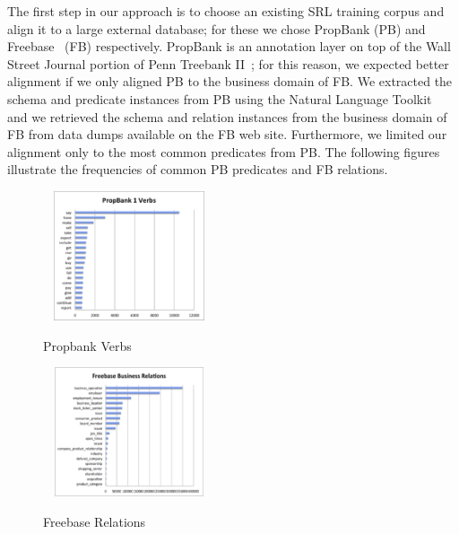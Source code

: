 The first step in our approach is to choose an existing SRL training corpus and align it to a large external database; for these we chose PropBank (PB) and Freebase~\cite{bollacker_freebase:_2008} (FB) respectively.
PropBank is an annotation layer on top of the Wall Street Journal portion of Penn Treebank II~\cite{marcus_building_1993}; for this reason, we expected better alignment if we only aligned PB to the business domain of FB.
We extracted the schema and predicate instances from PB using the Natural Language Toolkit~\cite{bird_nltk:_2006} and we retrieved the schema and relation instances from the business domain of FB from data dumps available on the FB web site.
Furthermore, we limited our alignment only to the most common predicates from PB.  The following figures illustrate the frequencies of common PB predicates and FB relations.

\begin{figure} [ht]

\begin{center}
{\label{avgstalls_CIF}\includegraphics[width = 2in, height = 1.5in]{propverbs.png}}
\caption{Propbank Verbs}
\vspace{-0.5cm}
\label{}
\end{center}
\end{figure}

\begin{figure} [ht]
\begin{center}
{\label{avgstalls_CIF}\includegraphics[width = 2in, height = 1.5in]{freebaserels.png}}
\caption{Freebase Relations}
\vspace{-0.5cm}
\label{}
\end{center}
\end{figure}

